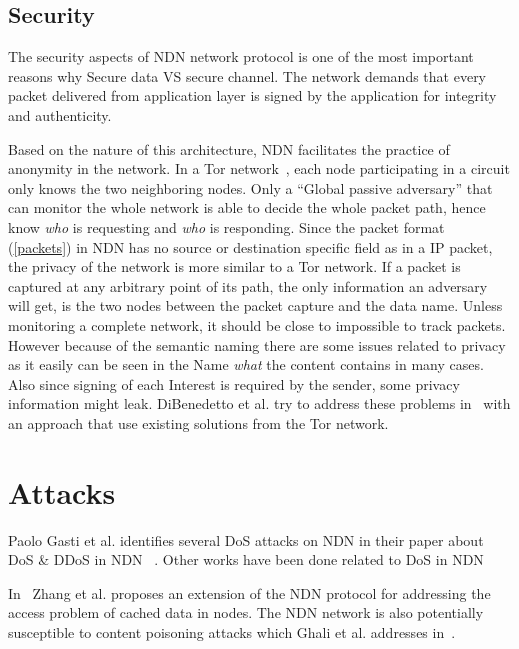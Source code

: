 \subsection{Security}\label{ndn-security}
The security aspects of \gls{NDN} network protocol is one of the most important reasons why 
Secure data VS secure channel.
The network demands that every packet delivered from application layer is signed by the application for integrity and authenticity.

Based on the nature of this architecture, \gls{NDN} facilitates the practice of anonymity in the network. 
In a Tor network~\cite{DBLP:conf/uss/DingledineMS04}, each node participating in a circuit only knows the two neighboring nodes.
Only a ``Global passive adversary'' that can monitor the whole network is able to decide the whole packet path, hence know \textit{who} is requesting and \textit{who} is responding.
Since the packet format (\autoref{packets}) in \gls{NDN} has no source or destination specific field as in a \gls{IP} packet, the privacy of the network is more similar to a Tor network.
If a packet is captured at any arbitrary point of its path, the only information an adversary will get, is the two nodes between the packet capture and the data name. Unless monitoring a complete network, it should be close to impossible to track packets.  
However because of the semantic naming there are some issues related to privacy as it easily can be seen in the Name \textit{what} the content contains in many cases.
Also since signing of each Interest is required by the sender, some privacy information might leak.
DiBenedetto et al. try to address these problems in~\cite{DBLP:conf/ndss/DiBenedettoGTU12} with an approach that use existing solutions from the Tor network.

\section{Attacks}

Paolo Gasti et al. identifies several \gls{DoS} attacks on \gls{NDN} in their paper about \gls{DoS} \& \gls{DDoS} in \gls{NDN} ~\cite{DBLP:conf/icccn/GastiTU013}. Other works have been done related to \gls{DoS} in \gls{NDN}~\cite{DBLP:journals/ijcomsys/WangCZQZ14, DBLP:conf/ancs/SoNO13, DBLP:journals/corr/abs-1303-4823}

In~\cite{DBLP:journals/tifs/LiZZSF15} Zhang et al. proposes an extension of the \gls{NDN} protocol for addressing the access problem of cached data in nodes.  
The \gls{NDN} network is also potentially susceptible to content poisoning attacks which Ghali et al. addresses in~\cite{DBLP:journals/ccr/GhaliTU14}.

